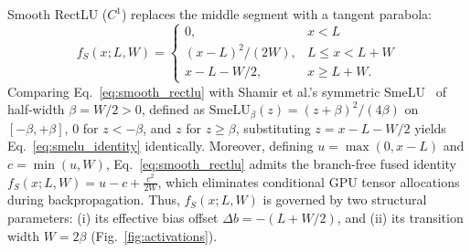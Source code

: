 \documentclass[10pt,a4paper]{article}
\begin{document}
Smooth RectLU ($C^1$) replaces the middle segment with a tangent parabola:
\begin{equation}
    f_S(x; L, W) = \begin{cases}
        0, & x < L \\
        (x - L)^2 / (2W), & L \le x < L + W \\
        x - L - W/2, & x \ge L + W.
    \end{cases}
    \label{eq:smooth_rectlu}
\end{equation}
Comparing Eq.~\eqref{eq:smooth_rectlu} with Shamir et al.'s symmetric SmeLU~\cite{shamir2020} of half-width $\beta = W/2 > 0$, defined as $\text{SmeLU}_\beta(z) = (z+\beta)^2/(4\beta)$ on $[-\beta, +\beta]$, $0$ for $z < -\beta$, and $z$ for $z \ge \beta$, substituting $z = x - L - W/2$ yields Eq.~\eqref{eq:smelu_identity} identically. Moreover, defining $u = \max(0, x-L)$ and $c = \min(u, W)$, Eq.~\eqref{eq:smooth_rectlu} admits the branch-free fused identity $f_S(x; L, W) = u - c + \frac{c^2}{2W}$, which eliminates conditional GPU tensor allocations during backpropagation. Thus, $f_S(x; L, W)$ is governed by two structural parameters: (i) its effective bias offset $\Delta b = -(L + W/2)$, and (ii) its transition width $W = 2\beta$ (Fig.~\ref{fig:activations}).
\end{document}
